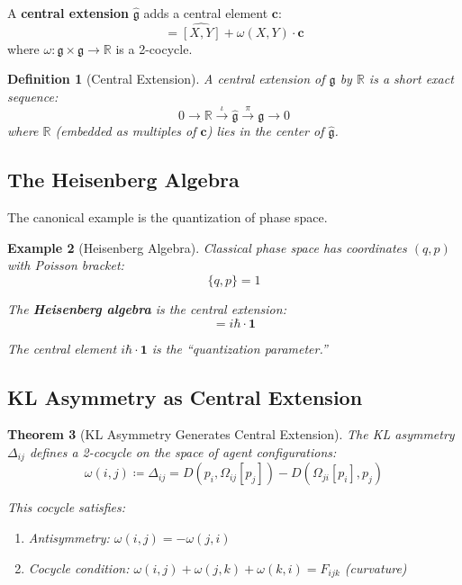 \documentclass[11pt,a4paper]{article}
\newtheorem{theorem}{Theorem}[section]
\newtheorem{definition}[theorem]{Definition}
\newtheorem{example}[theorem]{Example}
\newcommand{\R}{\mathbb{R}}
\newcommand{\id}{\mathbf{1}}
\begin{document}
A \textbf{central extension} $\hat{\mathfrak{g}}$ adds a central element $\mathbf{c}$:
\begin{equation}
    [\hat{X}, \hat{Y}] = \widehat{[X,Y]} + \omega(X, Y) \cdot \mathbf{c}
\end{equation}
where $\omega: \mathfrak{g} \times \mathfrak{g} \to \R$ is a 2-cocycle.

\begin{definition}[Central Extension]
A central extension of $\mathfrak{g}$ by $\R$ is a short exact sequence:
\begin{equation}
    0 \to \R \xrightarrow{\iota} \hat{\mathfrak{g}} \xrightarrow{\pi} \mathfrak{g} \to 0
\end{equation}
where $\R$ (embedded as multiples of $\mathbf{c}$) lies in the center of $\hat{\mathfrak{g}}$.
\end{definition}

\subsection{The Heisenberg Algebra}

The canonical example is the quantization of phase space.

\begin{example}[Heisenberg Algebra]
Classical phase space has coordinates $(q, p)$ with Poisson bracket:
\begin{equation}
    \{q, p\} = 1
\end{equation}

The \textbf{Heisenberg algebra} is the central extension:
\begin{equation}
    [\hat{q}, \hat{p}] = i\hbar \cdot \id
\end{equation}

The central element $i\hbar \cdot \id$ is the ``quantization parameter.''
\end{example}

\subsection{KL Asymmetry as Central Extension}

\begin{theorem}[KL Asymmetry Generates Central Extension]
The KL asymmetry $\Delta_{ij}$ defines a 2-cocycle on the space of agent configurations:
\begin{equation}
    \omega(i, j) \coloneqq \Delta_{ij} = D(p_i, \Omega_{ij}[p_j]) - D(\Omega_{ji}[p_i], p_j)
\end{equation}

This cocycle satisfies:
\begin{enumerate}
    \item Antisymmetry: $\omega(i, j) = -\omega(j, i)$
    \item Cocycle condition: $\omega(i, j) + \omega(j, k) + \omega(k, i) = F_{ijk}$ (curvature)
\end{enumerate}
\end{theorem}
\end{document}
